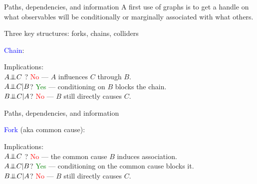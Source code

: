 \documentclass[xcolor=dvipsnames]{beamer}
\newcommand{\indep}{{\bot\negthickspace\negthickspace\bot}}
\begin{document}
\begin{frame}{Paths, dependencies, and information}  
 A first use of graphs is to get a handle on what observables will be conditionally or marginally associated with what others. \\

\medskip

 Three key structures: forks, chains, colliders \\

\medskip

 \textcolor{blue}{Chain}:
\begin{center}
\end{center}

 Implications:\\
\medskip
  $A \indep C$ ?  \textcolor{Red}{No} --- $A$ influences $C$ through $B$. \\
 \medskip
{} $A \indep C | B$?  \textcolor{Green}{Yes} --- conditioning on $B$ blocks the chain.\\
\medskip
{} $ B \indep C | A $?  \textcolor{Red}{No} --- $B$ still directly causes $C$.
\end{frame}

\begin{frame}{Paths, dependencies, and information}

 \textcolor{blue}{Fork} (aka common cause): 
\begin{center}
\end{center}

 Implications:\\
\medskip
  $A \indep C$ ?  \textcolor{Red}{No} --- the common cause $B$ induces association.\\
 \medskip
{} $A \indep C | B$?  \textcolor{Green}{Yes} --- conditioning on the common cause blocks it.\\
\medskip
{} $ B \indep C | A $?  \textcolor{Red}{No} --- $B$ still directly causes $C$.
\end{frame}
\end{document}
